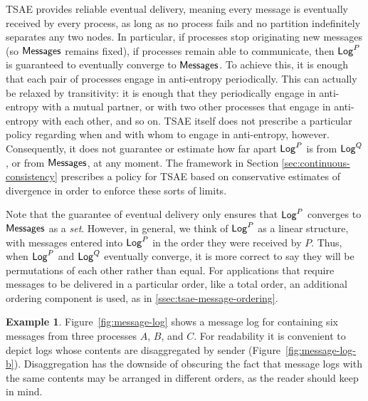 \documentclass[]             %
{NASA}                       %
\theoremstyle{definition}
\newtheorem{example}[theorem]{Example}
\begin{document}
TSAE provides reliable eventual delivery, meaning every message is
eventually received by every process, as long as no process fails and
no partition indefinitely separates any two nodes. In particular, if
processes stop originating new messages (so $\mathbf{\mathsf{Messages}}$ remains fixed), if
processes remain able to communicate, then $\mathsf{Log}^{P}$ is guaranteed to
eventually converge to $\mathbf{\mathsf{Messages}}$. To achieve this, it is enough that each
pair of processes engage in anti-entropy periodically. This can
actually be relaxed by transitivity: it is enough that they
periodically engage in anti-entropy with a mutual partner, or with two
other processes that engage in anti-entropy with each other, and so
on. TSAE itself does not prescribe a particular policy regarding when
and with whom to engage in anti-entropy, however. Consequently, it
does not guarantee or estimate how far apart $\mathsf{Log}^{P}$ is from
$\mathsf{Log}^{Q}$, or from $\mathbf{\mathsf{Messages}}$, at any moment. The framework in Section
\ref{sec:continuous-consistency} prescribes a policy for TSAE based on
conservative estimates of divergence in order to enforce these sorts
of limits.

Note that the guarantee of eventual delivery only ensures that
$\mathsf{Log}^{P}$ converges to $\mathbf{\mathsf{Messages}}$ as a \emph{set}. However, in general, we
think of $\mathsf{Log}^{P}$ as a linear structure, with messages entered into
$\mathsf{Log}^{P}$ in the order they were received by $P$. Thus, when $\mathsf{Log}^{P}$
and $\mathsf{Log}^{Q}$ eventually converge, it is more correct to say they will
be permutations of each other rather than equal. For applications that
require messages to be delivered in a particular order, like a total
order, an additional ordering component is used, as in
\ref{ssec:tsae-message-ordering}.

\begin{example}
  Figure~\ref{fig:message-log} shows a message log for containing six
  messages from three processes $A$, $B$, and $C$. For readability it
  is convenient to depict logs whose contents are disaggregated by
  sender (Figure~\ref{fig:message-log-b}). Disaggregation has the
  downside of obscuring the fact that message logs with the same
  contents may be arranged in different orders, as the reader should
  keep in mind.
\end{example}
\end{document}
